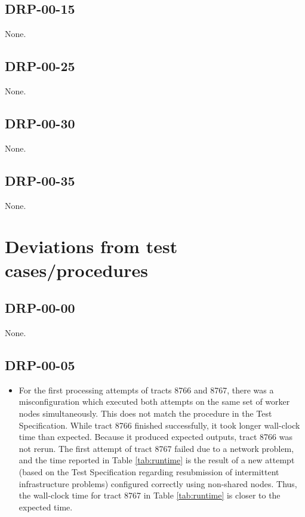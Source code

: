 \documentclass[DM,lsstdraft,STR,toc]{lsstdoc}
\begin{document}
\subsection{DRP-00-15}
\label{sect:problems-drp-00-15}

None.

\subsection{DRP-00-25}
\label{sect:problems-drp-00-25}

None.

\subsection{DRP-00-30}
\label{sect:problems-drp-00-30}

None.

\subsection{DRP-00-35}
\label{sect:problems-drp-00-35}

None.

\section{Deviations from test cases/procedures}

\subsection{DRP-00-00}

None.

\subsection{DRP-00-05}
\label{sect:deviation-drp-00-05}

\begin{itemize}
  \item{
    For the first processing attempts of tracts 8766 and 8767, there was a misconfiguration which executed both attempts on the same set of worker nodes simultaneously.
    This does not match the procedure in the Test Specification.
    While tract 8766 finished successfully, it took longer wall-clock time than expected.
    Because it produced expected outputs, tract 8766 was not rerun.
    The first attempt of tract 8767 failed due to a network problem, and the time reported in Table \ref{tab:runtime} is the result of a new attempt (based on the Test Specification regarding resubmission of intermittent infrastructure problems) configured correctly using non-shared nodes.
    Thus, the wall-clock time for tract 8767 in Table \ref{tab:runtime} is closer to the expected
	time.
  }
\end{itemize}
\end{document}
